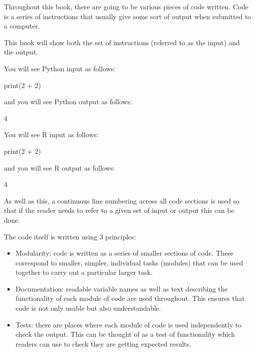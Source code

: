 Throughout this book, there are going to be various pieces of code written. Code
is a series of instructions that usually give some sort of output when submitted
to a computer.

This book will show both the set of instructions (referred to as the input) and
the output.

You will see Python input as follows:

\begin{pyin}
print(2 + 2)
\end{pyin}

and you will see Python output as follows:

\begin{pyout}
4
\end{pyout}

You will see R input as follows:

\begin{Rin}
print(2 + 2)
\end{Rin}

and you will see R output as follows:

\begin{Rout}
[1] 4
\end{Rout}

As well as this, a continuous line numbering across all code sections is used so
that if the reader needs to refer to a given set of input or output this can be
done.

The code itself is written using 3 principles:

\begin{itemize}
          \item Modularity: code is written as a
              series of smaller sections of code. These correspond to smaller,
              simpler, individual tasks (modules) that can be used together to
              carry out a particular larger task.
          \item Documentation: readable variable names as
              well as
              text describing the functionality of each module of code are used
              throughout. This ensures that code is not only usable but also
              understandable.
          \item Tests: there are places where each module of code is
              used independently to check the output. This can be thought of as a
              test of functionality which readers can use to check they are
              getting expected results.
\end{itemize}

